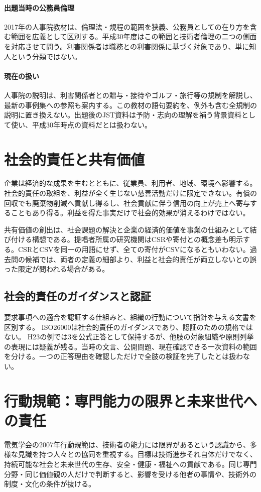 \paragraph{出題当時の公務員倫理}
2017年の人事院教材は、倫理法・規程の範囲を狭義、公務員としての在り方を含む範囲を広義として区別する\parencite{jinji_ethics2017}。平成30年度はこの範囲と技術者倫理の二つの側面を対応させて問う。利害関係者は職務との利害関係に基づく対象であり、単に知人という分類ではない。

\paragraph{現在の扱い}
人事院の説明は、利害関係者との贈与・接待やゴルフ・旅行等の規制を解説し、最新の事例集への参照も案内する\parencite{jinji_ethics_qa}。この教材の語句要約を、例外も含む全規制の説明に置き換えない。出題後のJST資料は予防・志向の理解を補う背景資料として使い、平成30年時点の資料だとは扱わない。

\section{社会的責任と共有価値}
\label{theory:ethics:csr}
企業は経済的な成果を生むとともに、従業員、利用者、地域、環境へ影響する。社会的責任の取組を、利益が全く生じない慈善活動だけに限定できない。有償の回収でも廃棄物削減へ貢献し得るし、社会貢献に伴う信用の向上が売上へ寄与することもあり得る。利益を得た事実だけで社会的効果が消えるわけではない。

共有価値の創出は、社会課題の解決と企業の経済的価値を事業の仕組みとして結び付ける構想である。提唱者所属の研究機関はCSRや寄付との概念差も明示する\parencite{hbs_csv}。CSRとCSVを同一の用語にせず、全ての寄付がCSVになるともいわない。過去問の候補では、両者の定義の細部より、利益と社会的責任が両立しないとの誤った限定が問われる場合がある。

\subsection{社会的責任のガイダンスと認証}
要求事項への適合を認証する仕組みと、組織の行動について指針を与える文書を区別する。
ISO26000は社会的責任のガイダンスであり、認証のための規格ではない\parencite{iso26000}。
H23の例では3を公式正答として保持するが、他肢の対象組織や原則列挙の表現には疑義が残る。当時の文言、公開問題、現在確認できる一次資料の範囲を分ける。一つの正答理由を確認しただけで全肢の検証を完了したとは扱わない。

\section{行動規範：専門能力の限界と未来世代への責任}
\label{theory:ethics:code}
電気学会の2007年行動規範は、技術者の能力には限界があるという認識から、多様な見識を持つ人々との協同を重視する。目標は技術進歩それ自体だけでなく、持続可能な社会と未来世代の生存、安全・健康・福祉への貢献である\parencite{ieej_conduct2007}。同じ専門分野・同じ価値観の人だけで判断すると、影響を受ける他者の事情や、技術外の制度・文化の条件が抜ける。

